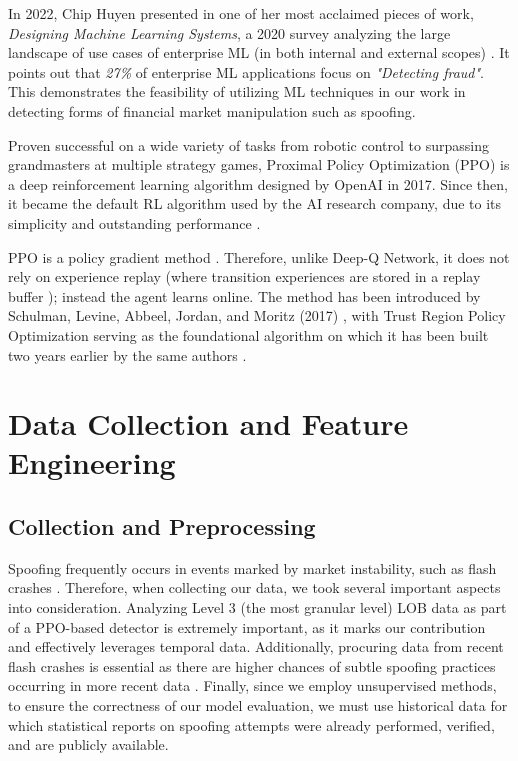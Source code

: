\documentclass[conference]{IEEEtran}
\begin{document}
\par In 2022, Chip Huyen presented in one of her most acclaimed pieces of work, \textit{Designing Machine Learning Systems}, a 2020 survey analyzing the large landscape of use cases of enterprise ML (in both internal and external scopes) \cite{Huyen_DMLS}. It points out that \textit{27\%} of enterprise ML applications focus on \textit{"Detecting fraud"}. This demonstrates the feasibility of utilizing ML techniques in our work in detecting forms of financial market manipulation such as spoofing.

\par Proven successful on a wide variety of tasks from robotic control to surpassing grandmasters at multiple strategy games, Proximal Policy Optimization (PPO) is a deep reinforcement learning algorithm designed by OpenAI in 2017. Since then, it became the default RL algorithm used by the AI research company, due to its simplicity and outstanding performance \cite{OpenAIPPO}.

\par PPO is a policy gradient method \cite{schulman2017proximal}. Therefore, unlike Deep-Q Network, it does not rely on experience replay (where transition experiences are stored in a replay buffer \cite{roderick2017implementing}); instead the agent learns online. The method has been introduced by Schulman, Levine, Abbeel, Jordan, and Moritz (2017) \cite{schulman2017proximal}, with Trust Region Policy Optimization serving as the foundational algorithm on which it has been built two years earlier by the same authors \cite{TRPO}.

\section{Data Collection and Feature Engineering}
\subsection{Collection and Preprocessing}
\par Spoofing frequently occurs in events marked by market instability, such as flash crashes \cite{Montgomery_SMMLOB}. Therefore, when collecting our data, we took several important aspects into consideration. Analyzing Level 3 (the most granular level) LOB data as part of a PPO-based detector is extremely important, as it marks our contribution and effectively leverages temporal data. Additionally, procuring data from recent flash crashes is essential as there are higher chances of subtle spoofing practices occurring in more recent data \cite{Kularatnam2024}. Finally, since we employ unsupervised methods, to ensure the correctness of our model evaluation, we must use historical data for which statistical reports on spoofing attempts were already performed, verified, and are publicly available. 
\end{document}
